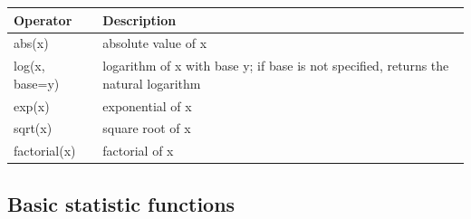 \documentclass[
]{book}
\begin{document}
\begin{longtable}[]{@{}ll@{}}
\toprule
\begin{minipage}[b]{0.47\columnwidth}\raggedright
Operator\strut
\end{minipage} & \begin{minipage}[b]{0.47\columnwidth}\raggedright
Description\strut
\end{minipage}\tabularnewline
\midrule
\endhead
\begin{minipage}[t]{0.47\columnwidth}\raggedright
abs(x)\strut
\end{minipage} & \begin{minipage}[t]{0.47\columnwidth}\raggedright
absolute value of x\strut
\end{minipage}\tabularnewline
\begin{minipage}[t]{0.47\columnwidth}\raggedright
log(x, base=y)\strut
\end{minipage} & \begin{minipage}[t]{0.47\columnwidth}\raggedright
logarithm of x with base y; if base is not specified, returns the natural logarithm\strut
\end{minipage}\tabularnewline
\begin{minipage}[t]{0.47\columnwidth}\raggedright
exp(x)\strut
\end{minipage} & \begin{minipage}[t]{0.47\columnwidth}\raggedright
exponential of x\strut
\end{minipage}\tabularnewline
\begin{minipage}[t]{0.47\columnwidth}\raggedright
sqrt(x)\strut
\end{minipage} & \begin{minipage}[t]{0.47\columnwidth}\raggedright
square root of x\strut
\end{minipage}\tabularnewline
\begin{minipage}[t]{0.47\columnwidth}\raggedright
factorial(x)\strut
\end{minipage} & \begin{minipage}[t]{0.47\columnwidth}\raggedright
factorial of x\strut
\end{minipage}\tabularnewline
\bottomrule
\end{longtable}

\hypertarget{basic-statistic-functions}{%
\subsection{Basic statistic functions}\label{basic-statistic-functions}}
\end{document}
